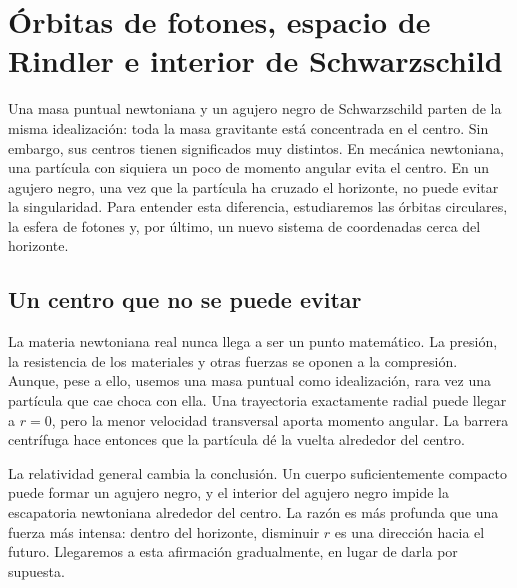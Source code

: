 \chapter{Órbitas de fotones, espacio de Rindler e interior de Schwarzschild}

Una masa puntual newtoniana y un agujero negro de Schwarzschild parten de la misma idealización: toda la masa gravitante está concentrada en el centro. Sin embargo, sus centros tienen significados muy distintos. En mecánica newtoniana, una partícula con siquiera un poco de momento angular evita el centro. En un agujero negro, una vez que la partícula ha cruzado el horizonte, no puede evitar la singularidad. Para entender esta diferencia, estudiaremos las órbitas circulares, la esfera de fotones y, por último, un nuevo sistema de coordenadas cerca del horizonte.

\section{Un centro que no se puede evitar}

La materia newtoniana real nunca llega a ser un punto matemático. La presión, la resistencia de los materiales y otras fuerzas se oponen a la compresión. Aunque, pese a ello, usemos una masa puntual como idealización, rara vez una partícula que cae choca con ella. Una trayectoria exactamente radial puede llegar a \(r=0\), pero la menor velocidad transversal aporta momento angular. La barrera centrífuga hace entonces que la partícula dé la vuelta alrededor del centro.

La relatividad general cambia la conclusión. Un cuerpo suficientemente compacto puede formar un agujero negro, y el interior del agujero negro impide la escapatoria newtoniana alrededor del centro. La razón es más profunda que una fuerza más intensa: dentro del horizonte, disminuir \(r\) es una dirección hacia el futuro. Llegaremos a esta afirmación gradualmente, en lugar de darla por supuesta.

\begin{classroomqa}
\end{classroomqa}


